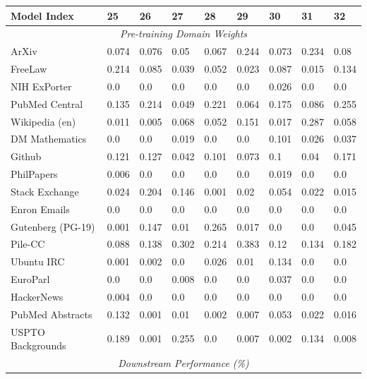 \begin{table}[!ht]
    \centering
    \begin{tabular}{lllllllll}
    \toprule
        \textbf{Model Index} & \textbf{25} & \textbf{26} & \textbf{27} & \textbf{28} & \textbf{29} & \textbf{30} & \textbf{31} & \textbf{32} \\
        \midrule
        \multicolumn{9}{c}{\textit{Pre-training Domain Weights}} \\
        ArXiv & 0.074 & 0.076 & 0.05 & 0.067 & 0.244 & 0.073 & 0.234 & 0.08 \\ 
        FreeLaw & 0.214 & 0.085 & 0.039 & 0.052 & 0.023 & 0.087 & 0.015 & 0.134 \\ 
        NIH ExPorter & 0.0 & 0.0 & 0.0 & 0.0 & 0.0 & 0.026 & 0.0 & 0.0 \\ 
        PubMed Central & 0.135 & 0.214 & 0.049 & 0.221 & 0.064 & 0.175 & 0.086 & 0.255 \\ 
        Wikipedia (en) & 0.011 & 0.005 & 0.068 & 0.052 & 0.151 & 0.017 & 0.287 & 0.058 \\ 
        DM Mathematics & 0.0 & 0.0 & 0.019 & 0.0 & 0.0 & 0.101 & 0.026 & 0.037 \\ 
        Github & 0.121 & 0.127 & 0.042 & 0.101 & 0.073 & 0.1 & 0.04 & 0.171 \\ 
        PhilPapers & 0.006 & 0.0 & 0.0 & 0.0 & 0.0 & 0.019 & 0.0 & 0.0 \\ 
        Stack Exchange & 0.024 & 0.204 & 0.146 & 0.001 & 0.02 & 0.054 & 0.022 & 0.015 \\ 
        Enron Emails & 0.0 & 0.0 & 0.0 & 0.0 & 0.0 & 0.0 & 0.0 & 0.0 \\ 
        Gutenberg (PG-19) & 0.001 & 0.147 & 0.01 & 0.265 & 0.017 & 0.0 & 0.0 & 0.045 \\ 
        Pile-CC & 0.088 & 0.138 & 0.302 & 0.214 & 0.383 & 0.12 & 0.134 & 0.182 \\ 
        Ubuntu IRC & 0.001 & 0.002 & 0.0 & 0.026 & 0.01 & 0.134 & 0.0 & 0.0 \\ 
        EuroParl & 0.0 & 0.0 & 0.008 & 0.0 & 0.0 & 0.037 & 0.0 & 0.0 \\ 
        HackerNews & 0.004 & 0.0 & 0.0 & 0.0 & 0.0 & 0.0 & 0.0 & 0.0 \\ 
        PubMed Abstracts & 0.132 & 0.001 & 0.01 & 0.002 & 0.007 & 0.053 & 0.022 & 0.016 \\ 
        USPTO Backgrounds & 0.189 & 0.001 & 0.255 & 0.0 & 0.007 & 0.002 & 0.134 & 0.008 \\ 
        \midrule
        \multicolumn{9}{c}{\textit{Downstream Performance (\%)}} \\

\end{tabular}
\end{table}

